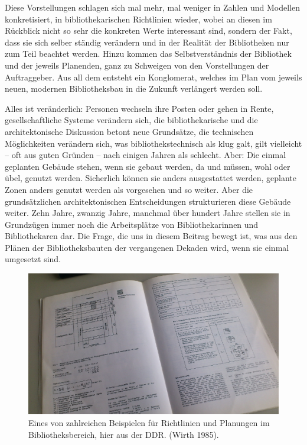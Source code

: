 \documentclass[a4paper,
fontsize=11pt,
oneside,
numbers=noperiodatend,
parskip=half-,
bibliography=totoc,
final
]{scrartcl}
\begin{document}
Diese Vorstellungen schlagen sich mal mehr, mal weniger in Zahlen und
Modellen konkretisiert, in bibliothekarischen Richtlinien wieder, wobei
an diesen im Rückblick nicht so sehr die konkreten Werte interessant
sind, sondern der Fakt, dass sie sich selber ständig verändern und in
der Realität der Bibliotheken nur zum Teil beachtet werden. Hinzu kommen
das Selbstverständnis der Bibliothek und der jeweils Planenden, ganz zu
Schweigen von den Vorstellungen der Auftraggeber. Aus all dem entsteht
ein Konglomerat, welches im Plan vom jeweils neuen, modernen
Bibliotheksbau in die Zukunft verlängert werden soll.

Alles ist veränderlich: Personen wechseln ihre Posten oder gehen in
Rente, gesellschaftliche Systeme verändern sich, die bibliothekarische
und die architektonische Diskussion betont neue Grundsätze, die
technischen Möglichkeiten verändern sich, was bibliothekstechnisch als
klug galt, gilt vielleicht -- oft aus guten Gründen -- nach einigen
Jahren als schlecht. Aber: Die einmal geplanten Gebäude stehen, wenn sie
gebaut werden, da und müssen, wohl oder übel, genutzt werden. Sicherlich
können sie anders ausgestattet werden, geplante Zonen anders genutzt
werden als vorgesehen und so weiter. Aber die grundsätzlichen
architektonischen Entscheidungen strukturieren diese Gebäude weiter.
Zehn Jahre, zwanzig Jahre, manchmal über hundert Jahre stellen sie in
Grundzügen immer noch die Arbeitsplätze von Bibliothekarinnen und
Bibliothekaren dar. Die Frage, die uns in diesem Beitrag bewegt ist, was
aus den Plänen der Bibliotheksbauten der vergangenen Dekaden wird, wenn
sie einmal umgesetzt sind.

\begin{figure}[htbp]
\centering
\includegraphics{./img/001.jpg}
\caption{Eines von zahlreichen Beispielen für Richtlinien und Planungen
im Bibliotheksbereich, hier aus der DDR. (Wirth 1985).}
\end{figure}
\end{document}

